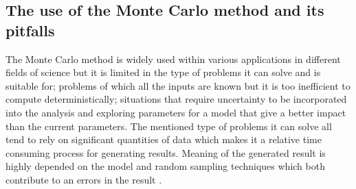 \subsection{The use of the Monte Carlo method and its pitfalls}
The Monte Carlo method is widely used within various applications in different fields of science but it is limited in the type of problems it can solve and is suitable for; problems of which all the inputs are known but it is too inefficient to compute deterministically; situations that require uncertainty to be incorporated into the analysis and exploring parameters for a model that give a better impact than the current parameters. The mentioned type of problems it can solve all tend to rely on significant quantities of data which makes it a relative time consuming process for generating results. Meaning of the generated result is highly depended on the model and random sampling techniques which both contribute to an errors in the result \cite{}.
